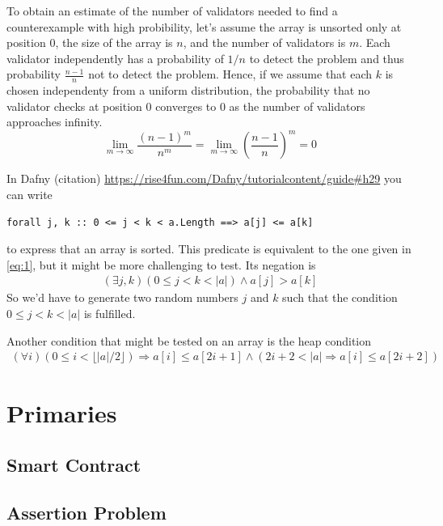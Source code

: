 \documentclass[runningheads]{llncs}
\begin{document}
To obtain an estimate of the number of validators needed to find a counterexample with
high probibility, 
let's assume the array is unsorted only at position $0$, the size of the array is $n$,
and the number of validators is $m$. Each validator independently has a probability of
$1/n$ to detect the problem and thus probability $\frac{n-1} n$ not to detect the
problem. Hence, if we assume that each $k$ is chosen independenty from a uniform distribution,
the probability that no validator checks at
position $0$ converges to $0$ as the number of validators approaches infinity.
\begin{displaymath}
  \lim_{m\to\infty}\frac{(n-1)^m}{n^m}
  = \lim_{m\to\infty} \left(\frac{n-1}{n}\right)^m
  = 0
\end{displaymath}

In Dafny (citation) \url{https://rise4fun.com/Dafny/tutorialcontent/guide#h29} you can
write
\begin{lstlisting}
forall j, k :: 0 <= j < k < a.Length ==> a[j] <= a[k]
\end{lstlisting}
to express that an array is sorted. This predicate is equivalent to the one given in
\eqref{eq:1}, but it might be more challenging to test. Its negation is
\begin{gather}
  \label{eq:2}
  (\exists j, k ) (0\le j< k < |a|) \wedge a[j] > a[k]
\end{gather}
So we'd have to generate two random numbers $j$ and $k$ such that the condition $0 \le
j < k < |a|$ is fulfilled.


Another condition that might be tested on an array is the heap condition
\begin{gather}
  \label{eq:3}
  (\forall i) (0 \le i < \lfloor|a|/2\rfloor) \Rightarrow a[i] \le a[2i+1] \wedge (2i+2
  < |a| \Rightarrow a[i] \le a[2i+2])
\end{gather}
\section{Primaries}
\label{sec:primaries}

\subsection{Smart Contract}
\label{subsec:smart-contract}

\subsection{Assertion Problem}
\label{subsec:problem}
\end{document}

